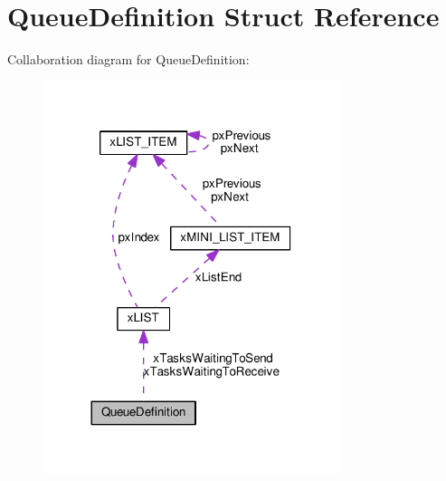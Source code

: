 \hypertarget{structQueueDefinition}{}\section{Queue\+Definition Struct Reference}
\label{structQueueDefinition}


Collaboration diagram for Queue\+Definition\+:\nopagebreak
\begin{figure}[H]
\begin{center}
\leavevmode
\includegraphics[width=245pt]{dd/d75/structQueueDefinition__coll__graph}
\end{center}
\end{figure}
